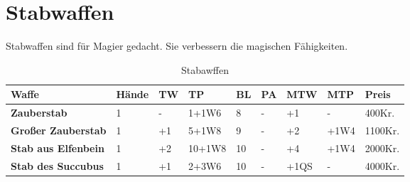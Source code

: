 \section{Stabwaffen}
Stabwaffen sind für Magier gedacht. Sie verbessern die magischen Fähigkeiten.

\begin{table}[h]
\begin{center}
\begin{tabular}{|l|l|l|l|l|l|l|l|l|}
\hline
\textbf{Waffe} & \textbf{Hände} & \textbf{TW} & \textbf{TP} & \textbf{BL} & \textbf{PA} & \textbf{MTW} & \textbf{MTP} & \textbf{Preis} \\

\hline
\textbf{Zauberstab} & 1 & - & 1+1W6 & 8 & - & +1 & - & 400Kr. \\

\hline
\textbf{Großer Zauberstab} & 1 & +1 & 5+1W8 & 9 & - & +2 & +1W4 & 1100Kr. \\

\hline
\textbf{Stab aus Elfenbein} & 1 & +2 & 10+1W8 & 10 & - & +4 & +1W4 & 2000Kr. \\

\hline
\textbf{Stab des Succubus} & 1 & +1 & 2+3W6 & 10 & - & +1QS & - & 4000Kr. \\

\hline
\end{tabular}
\end{center}
\caption{Stabawffen}
\label{tab:Stabawffen}
\end{table}